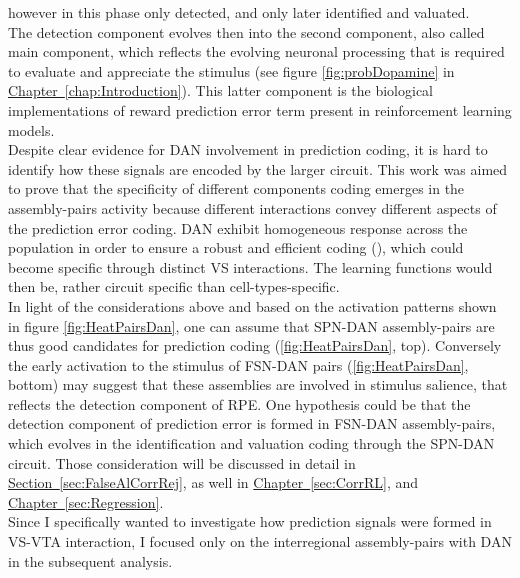 however in this phase only detected, and only later identified and valuated.\\The detection component evolves then into the second component, also called main component, which reflects the evolving neuronal processing that is required to evaluate and appreciate the stimulus (see figure \ref{fig:probDopamine} in \hyperref[chap:Introduction]{Chapter~\ref*{chap:Introduction}}). This latter component is the biological implementations of reward prediction error term present in reinforcement learning models.\\Despite clear evidence for DAN involvement in prediction coding, it is hard to identify how these signals are encoded by the larger circuit. This work was aimed to prove that the specificity of different components coding emerges in the assembly-pairs activity because different interactions convey different aspects of the prediction error coding. DAN exhibit homogeneous response across the population in order to ensure a robust and efficient coding (\cite{UchidaDop}), which could become specific through distinct VS interactions. The learning functions would then be, rather circuit specific than cell-types-specific.\\In light of the considerations above and based on the activation patterns shown in figure \ref{fig:HeatPairsDan}, one can assume that SPN-DAN assembly-pairs are thus good candidates for prediction coding (\ref{fig:HeatPairsDan}, top). Conversely the early activation to the stimulus of FSN-DAN pairs (\ref{fig:HeatPairsDan}, bottom) may suggest that these assemblies are involved in stimulus salience, that reflects the detection component of RPE. One hypothesis could be that the detection component of prediction error is formed in FSN-DAN assembly-pairs, which evolves in the identification and valuation coding through the SPN-DAN circuit.
Those consideration will be discussed in detail in \hyperref[sec:FalseAlCorrRej]{Section~\ref*{sec:FalseAlCorrRej}}, as well in \hyperref[sec:CorrRL]{Chapter~\ref*{sec:CorrRL}}, and \hyperref[sec:Regression]{Chapter~\ref*{sec:Regression}}.\\Since I specifically wanted to investigate how prediction signals were formed in VS-VTA interaction, I focused only on the interregional assembly-pairs with DAN in the subsequent analysis.


